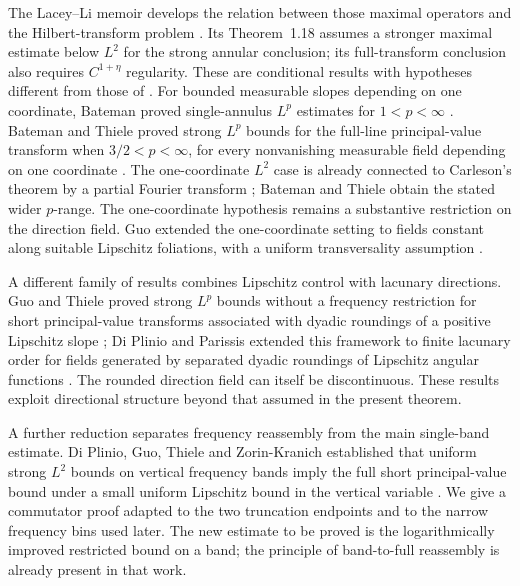 The Lacey--Li memoir develops the relation between those maximal
operators and the Hilbert-transform problem \cite{LLStein}. Its
Theorem~1.18 assumes a stronger maximal estimate below \(L^2\) for
the strong annular conclusion; its full-transform conclusion also
requires \(C^{1+\eta}\) regularity. These are conditional results with
hypotheses different from those of . For bounded
measurable slopes depending on one coordinate, Bateman proved
single-annulus \(L^p\) estimates for \(1<p<\infty\)
\cite{Bateman2013}. Bateman and Thiele proved strong \(L^p\) bounds
for the full-line principal-value transform when \(3/2<p<\infty\),
for every nonvanishing measurable field depending on one coordinate
\cite[Theorem~1]{BatemanThiele2013}. The one-coordinate \(L^2\) case is already connected to
Carleson's theorem by a partial Fourier transform
\cite{Carleson1966,BatemanThiele2013}; Bateman and Thiele obtain the stated wider
\(p\)-range. The one-coordinate hypothesis remains a substantive
restriction on the direction field. Guo extended the one-coordinate setting to
fields constant along suitable Lipschitz foliations, with a uniform
transversality assumption \cite{Guo2015,Guo2017}.

A different family of results combines Lipschitz control with
lacunary directions. Guo and Thiele proved strong \(L^p\) bounds
without a frequency restriction for short principal-value transforms
associated with dyadic roundings of a positive Lipschitz slope
\cite{GuoThiele2017}; Di Plinio and Parissis extended this framework
to finite lacunary order for fields generated by separated dyadic
roundings of Lipschitz angular functions \cite{DiPlinioParissis2018}.
The rounded direction field can itself be discontinuous. These
results exploit directional structure beyond that assumed in the
present theorem.

A further reduction separates frequency reassembly from the main
single-band estimate. Di Plinio, Guo, Thiele and Zorin-Kranich
established that uniform strong \(L^2\) bounds on vertical frequency
bands imply the full short principal-value bound under a small uniform
Lipschitz bound in the vertical variable
\cite[Corollaries~1.3--1.4 of the author version]{DiPlinioGuoThieleZorinKranich2018}.
We give a commutator proof adapted to the two truncation endpoints
and to the narrow frequency bins used later. The new estimate to be
proved is the logarithmically improved restricted bound on a band;
the principle of band-to-full reassembly is already present in that
work.

